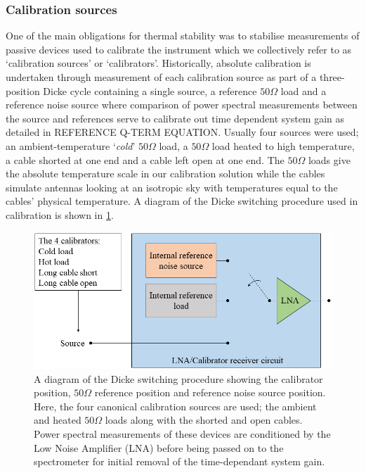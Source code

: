 \subsubsection{Calibration sources}
One of the main obligations for thermal stability was to stabilise measurements of passive devices used to calibrate the instrument which we collectively refer to as ‘calibration sources’ or ‘calibrators’. Historically, absolute calibration is undertaken through measurement of each calibration source as part of a three-position Dicke cycle containing a single source, a reference $50 \Omega$ load and a reference noise source where comparison of power spectral measurements between the source and references serve to calibrate out time dependent system gain as detailed in REFERENCE Q-TERM EQUATION. Usually four sources were used; an ambient-temperature ‘\textit{cold}’ $50 \Omega$ load, a $50 \Omega$ load heated to high temperature, a cable shorted at one end and a cable left open at one end. The $50 \Omega$ loads give the absolute temperature scale in our calibration solution while the cables simulate antennas looking at an isotropic sky with temperatures equal to the cables’ physical temperature. A diagram of the Dicke switching procedure used in calibration is shown in \cref{fig:dicke}.
\begin{figure}
    \centering
    \includegraphics[scale=0.5]{dicke}
    \caption{A diagram of the Dicke switching procedure showing the calibrator position, $50 \Omega$ reference position and reference noise source position. Here, the four canonical calibration sources are used; the ambient and heated $50 \Omega$ loads along with the shorted and open cables. Power spectral measurements of these devices are conditioned by the Low Noise Amplifier (LNA) before being passed on to the spectrometer for initial removal of the time-dependant system gain.}
    \label{fig:dicke}
\end{figure}

